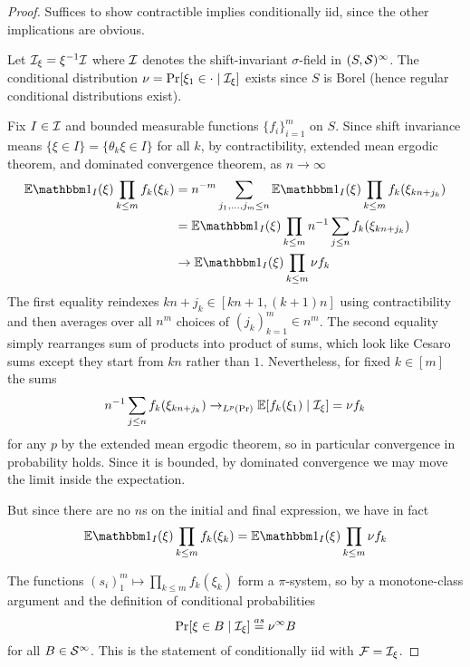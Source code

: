 \begin{proof}
  Suffices to show contractible implies conditionally iid, since
  the other implications are obvious.

  Let $\mathcal{I}_\xi = \xi^{-1} \mathcal{I}$ where $\mathcal{I}$ denotes the shift-invariant
  $\sigma$-field in $(S, \mathcal{S})^\infty$.
  The conditional distribution $\nu = \Pr[\xi_1 \in \cdot \mid \mathcal{I}_\xi]$
  exists since $S$ is Borel (hence regular conditional distributions exist).

  Fix $I \in \mathcal{I}$ and bounded measurable functions $\{f_i\}_{i=1}^m$ on $S$.
  Since shift invariance means $\{\xi \in I\} = \{\theta_k \xi \in I\}$
  for all $k$,
  by contractibility, extended mean ergodic theorem, and dominated convergence
  theorem, as $n \to \infty$
  \begin{align*}
    \bE \ind_I(\xi) \prod_{k \leq m} f_k(\xi_k)
    &= n^{-m} \sum_{j_1,\ldots,j_m \leq n} \bE \ind_I(\xi) \prod_{k \leq m} f_k(\xi_{kn + j_k}) \\
    &= \bE \ind_I(\xi) \prod_{k \leq m} n^{-1} \sum_{j \leq n} f_k(\xi_{kn + j_k}) \\
    &\to \bE \ind_I(\xi) \prod_{k \leq m} \nu f_k
  \end{align*}
  The first equality reindexes $k n + j_k \in [kn+1,(k+1)n]$ using
  contractibility and then averages over all $n^m$ choices of
  $(j_k)_{k=1}^m \in n^m$. The second equality simply rearranges sum of
  products into product of sums, which look like Cesaro sums except they
  start from $kn$ rather than $1$. Nevertheless, for fixed $k \in [m]$
  the sums
  \[
    n^{-1} \sum_{j \leq n} f_k(\xi_{k n + j_k}) \to_{L^p(\Pr)} \mathbb{E}[ f_k(\xi_1) \mid \mathcal{I}_\xi] = \nu f_k
  \]
  for any $p$ by the extended mean ergodic theorem, so in particular
  convergence in probability holds. Since it is bounded, by dominated
  convergence we may move the limit inside the expectation.

  But since there are no $n$s on the initial and final expression, we have
  in fact
  \[
    \bE \ind_I(\xi) \prod_{k \leq m} f_k(\xi_k)
    = \bE \ind_I(\xi) \prod_{k \leq m} \nu f_k
  \]

  The functions $(s_i)_1^m \mapsto \prod_{k \leq m} f_k(\xi_k)$ form a
  $\pi$-system, so by a monotone-class argument and the definition
  of conditional probabilities
  \[
    \Pr[\xi \in B \mid \mathcal{I}_\xi] \overset{as}{=} \nu^\infty B
  \]
  for all $B \in \mathcal{S}^\infty$. This is the statement of conditionally iid
  with $\mathcal{F} = \mathcal{I}_\xi$.
\end{proof}

